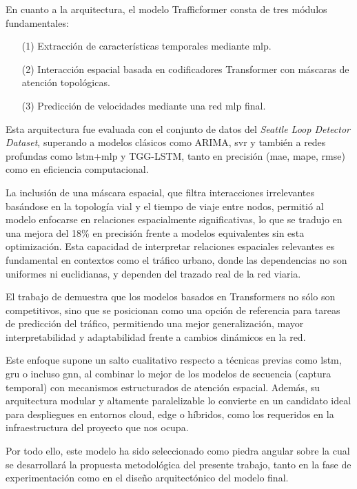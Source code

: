 En cuanto a la arquitectura, el modelo Trafficformer consta de tres módulos fundamentales: 
\begin{itemize}
	\item[(1)] Extracción de características temporales mediante \acrlong{mlp}. 
	\item[(2)] Interacción espacial basada en codificadores Transformer con máscaras de atención topológicas. 
	\item[(3)] Predicción de velocidades mediante una red \acrshort{mlp} final. 
\end{itemize}

Esta arquitectura fue evaluada con el conjunto de datos del \textit{Seattle Loop Detector Dataset}, superando a modelos clásicos como ARIMA, \acrshort{svr} y también a redes profundas como \acrshort{lstm}+\acrshort{mlp} y TGG-LSTM, tanto en precisión (\acrshort{mae}, \acrshort{mape}, \acrshort{rmse}) como en eficiencia computacional.

La inclusión de una máscara espacial, que filtra interacciones irrelevantes basándose en la topología vial y el tiempo de viaje entre nodos, permitió al modelo enfocarse en relaciones espacialmente significativas, lo que se tradujo en una mejora del 18\% en precisión frente a modelos equivalentes sin esta optimización. Esta capacidad de interpretar relaciones espaciales relevantes es fundamental en contextos como el tráfico urbano, donde las dependencias no son uniformes ni euclidianas, y dependen del trazado real de la red viaria.

\vspace{0.5cm}

El trabajo de \cite{trafficformer} demuestra que los modelos basados en Transformers no sólo son competitivos, sino que se posicionan como una opción de referencia para tareas de predicción del tráfico, permitiendo una mejor generalización, mayor interpretabilidad y adaptabilidad frente a cambios dinámicos en la red.

Este enfoque supone un salto cualitativo respecto a técnicas previas como \acrshort{lstm}, \acrshort{gru} o incluso \acrshort{gnn}, al combinar lo mejor de los modelos de secuencia (captura temporal) con mecanismos estructurados de atención espacial. Además, su arquitectura modular y altamente paralelizable lo convierte en un candidato ideal para despliegues en entornos cloud, edge o híbridos, como los requeridos en la infraestructura del proyecto que nos ocupa.

Por todo ello, este modelo ha sido seleccionado como piedra angular sobre la cual se desarrollará la propuesta metodológica del presente trabajo, tanto en la fase de experimentación como en el diseño arquitectónico del modelo final.

